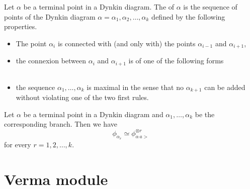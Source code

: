 Let $\alpha$ be a terminal point in a Dynkin diagram. The  of $\alpha$ is the sequence of points of the Dynkin diagram $\alpha=\alpha_1,\alpha_2,\ldots,\alpha_k$ defined by the following properties.
\begin{itemize}
    \item The point $\alpha_i$ is connected with (and only with) the points $\alpha_{i-1}$ and $\alpha_{i+1}$,
    \item the connexion between $\alpha_i$ and $\alpha_{i+1}$ is of one of the following forms
        \begin{subequations}
            \begin{align}
            \\
   \\
   
            \end{align}
        \end{subequations}
    \item the sequence $\alpha_1,\ldots,\alpha_k$ is maximal in the sense that no $\alpha_{k+1}$ can be added without violating one of the two first rules.
\end{itemize}

\begin{proposition}
    Let $\alpha$ be a terminal point in a Dynkin diagram and $\alpha_1,\ldots,\alpha_k$ be the corresponding branch. Then we have
    \begin{equation}
        \phi_{\alpha_r}\simeq \phi^{\otimes r}_{\alpha\,a>}
    \end{equation}
    for every $r=1,2,\ldots,k$.
\end{proposition}

\section{Verma module}

